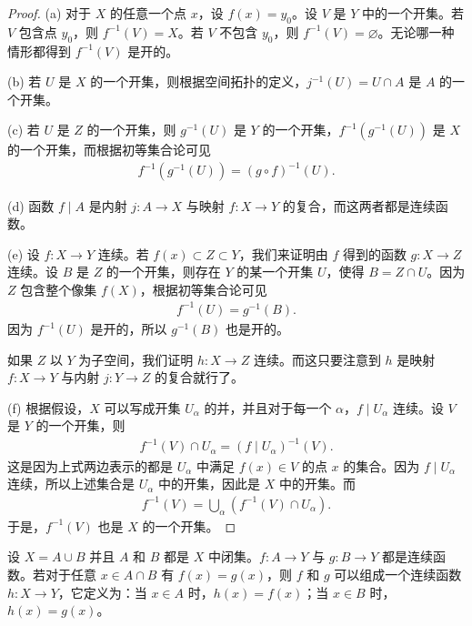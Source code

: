\documentclass[../../main.tex]{subfiles}
\begin{document}
\begin{proof}
(a) 对于 $X$ 的任意一个点 $x$，设 $f(x) = y_{0}$。设 $V$ 是 $Y$ 中的一个开集。若 $V$ 包含点 $y_{0}$，则 $f^{-1}(V) = X$。若 $V$ 不包含 $y_{0}$，则 $f^{-1}(V) = \varnothing$。无论哪一种情形都得到 $f^{-1}(V)$ 是开的。

(b) 若 $U$ 是 $X$ 的一个开集，则根据空间拓扑的定义，$j^{-1}(U) = U \cap A$ 是 $A$ 的一个开集。

(c) 若 $U$ 是 $Z$ 的一个开集，则 $g^{-1}(U)$ 是 $Y$ 的一个开集，$f^{-1}(g^{-1}(U))$ 是 $X$ 的一个开集，而根据初等集合论可见
\begin{align*}
f^{-1}(g^{-1}(U)) = (g \circ f)^{-1}(U).
\end{align*}

(d) 函数 $f \mid A$ 是内射 $j: A \rightarrow X$ 与映射 $f: X \rightarrow Y$ 的复合，而这两者都是连续函数。

(e) 设 $f: X \rightarrow Y$ 连续。若 $f(x) \subset Z \subset Y$，我们来证明由 $f$ 得到的函数 $g: X \rightarrow Z$ 连续。设 $B$ 是 $Z$ 的一个开集，则存在 $Y$ 的某一个开集 $U$，使得 $B = Z \cap U$。因为 $Z$ 包含整个像集 $f(X)$，根据初等集合论可见
\begin{align*}
f^{-1}(U) = g^{-1}(B).
\end{align*}
因为 $f^{-1}(U)$ 是开的，所以 $g^{-1}(B)$ 也是开的。

如果 $Z$ 以 $Y$ 为子空间，我们证明 $h: X \rightarrow Z$ 连续。而这只要注意到 $h$ 是映射 $f: X \rightarrow Y$ 与内射 $j: Y \rightarrow Z$ 的复合就行了。

(f) 根据假设，$X$ 可以写成开集 $U_{\alpha}$ 的并，并且对于每一个 $\alpha$，$f \mid U_{\alpha}$ 连续。设 $V$ 是 $Y$ 的一个开集，则
\begin{align*}
f^{-1}(V) \cap U_{\alpha} = (f \mid U_{\alpha})^{-1}(V).
\end{align*}
这是因为上式两边表示的都是 $U_{\alpha}$ 中满足 $f(x) \in V$ 的点 $x$ 的集合。因为 $f \mid U_{\alpha}$ 连续，所以上述集合是 $U_{\alpha}$ 中的开集，因此是 $X$ 中的开集。而
\begin{align*}
f^{-1}(V) = \bigcup_{\alpha} (f^{-1}(V) \cap U_{\alpha}).
\end{align*}
于是，$f^{-1}(V)$ 也是 $X$ 的一个开集。
\end{proof}

\begin{theorem}[黏结引理]\label{theorem:ch02-黏结引理}
设 $X = A \cup B$ 并且 $A$ 和 $B$ 都是 $X$ 中闭集。$f: A \rightarrow Y$ 与 $g: B \rightarrow Y$ 都是连续函数。若对于任意 $x \in A \cap B$ 有 $f(x) = g(x)$，则 $f$ 和 $g$ 可以组成一个连续函数 $h: X \rightarrow Y$，它定义为：当 $x \in A$ 时，$h(x) = f(x)$；当 $x \in B$ 时，$h(x) = g(x)$。
\end{theorem}
\end{document}
